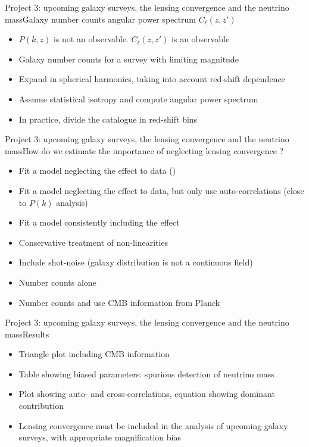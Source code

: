 \documentclass{beamer}
\begin{document}
\begin{frame}{Project 3: upcoming galaxy surveys, the lensing convergence and the neutrino mass}{Galaxy number counts angular power spectrum $C_\ell(z,z')$}
\begin{itemize}
\item $P(k,z)$ is not an observable. $C_\ell(z,z')$ is an observable
\item Galaxy number counts for a survey with limiting magnitude
\item Expand in spherical harmonics, taking into account red-shift dependence
\item Assume statistical isotropy and compute angular power spectrum 
\item In practice, divide the catalogue in red-shift bins 
\end{itemize}
\end{frame}

\begin{frame}{Project 3: upcoming galaxy surveys, the lensing convergence and the neutrino mass}{How do we estimate the importance of neglecting lensing convergence ?}
\begin{itemize}
\item Fit a model neglecting the effect to data ()
\item Fit a model neglecting the effect to data, but only use auto-correlations (close to $P(k)$ analysis)
\item Fit a model consistently including the effect 
\item Conservative treatment of non-linearities
\item Include shot-noise (galaxy distribution is not a continuous field)
\item Number counts alone 
\item Number counts and use CMB information from Planck
\end{itemize}
\end{frame}

\begin{frame}{Project 3: upcoming galaxy surveys, the lensing convergence and the neutrino mass}{Results}
\begin{itemize}
\item Triangle plot including CMB information
\item Table showing biased parameters: spurious detection of neutrino mass
\item Plot showing auto- and cross-correlations, equation showing dominant contribution
\item Lensing convergence must be included in the analysis of upcoming galaxy surveys, with appropriate magnification bias
\end{itemize}
\end{frame}
\end{document}
